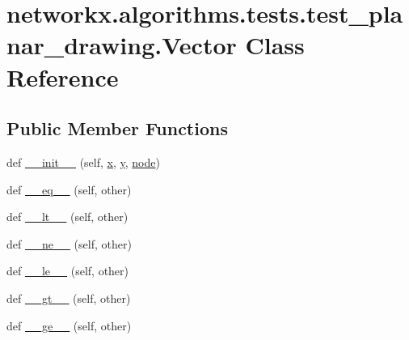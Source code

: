 \hypertarget{classnetworkx_1_1algorithms_1_1tests_1_1test__planar__drawing_1_1Vector}{}\section{networkx.\+algorithms.\+tests.\+test\+\_\+planar\+\_\+drawing.\+Vector Class Reference}
\label{classnetworkx_1_1algorithms_1_1tests_1_1test__planar__drawing_1_1Vector}
\subsection*{Public Member Functions}
\begin{DoxyCompactItemize}
\item 
def \hyperlink{classnetworkx_1_1algorithms_1_1tests_1_1test__planar__drawing_1_1Vector_ae12a093b25f636e1cabd33e08a45f9c4}{\+\_\+\+\_\+init\+\_\+\+\_\+} (self, \hyperlink{classnetworkx_1_1algorithms_1_1tests_1_1test__planar__drawing_1_1Vector_aee97bd5f43d0150508fc1487ce252897}{x}, \hyperlink{classnetworkx_1_1algorithms_1_1tests_1_1test__planar__drawing_1_1Vector_a0bf8986b1ca75c5c689d13a5c9fbf934}{y}, \hyperlink{classnetworkx_1_1algorithms_1_1tests_1_1test__planar__drawing_1_1Vector_a9f918dbe66cff416ed929e030ed91394}{node})
\item 
def \hyperlink{classnetworkx_1_1algorithms_1_1tests_1_1test__planar__drawing_1_1Vector_a182b33220fc73e6fc6a18e439bf05b4b}{\+\_\+\+\_\+eq\+\_\+\+\_\+} (self, other)
\item 
def \hyperlink{classnetworkx_1_1algorithms_1_1tests_1_1test__planar__drawing_1_1Vector_adb720f3f5c001be1cfcf1b5ca0b7ddcd}{\+\_\+\+\_\+lt\+\_\+\+\_\+} (self, other)
\item 
def \hyperlink{classnetworkx_1_1algorithms_1_1tests_1_1test__planar__drawing_1_1Vector_a3c517d48081484f9dfcdf9cc687eb1ab}{\+\_\+\+\_\+ne\+\_\+\+\_\+} (self, other)
\item 
def \hyperlink{classnetworkx_1_1algorithms_1_1tests_1_1test__planar__drawing_1_1Vector_a405a43d2456ce7a1165d8f668b90f2c9}{\+\_\+\+\_\+le\+\_\+\+\_\+} (self, other)
\item 
def \hyperlink{classnetworkx_1_1algorithms_1_1tests_1_1test__planar__drawing_1_1Vector_a5e556f9f924c08d3bb058d34ca7b8c3c}{\+\_\+\+\_\+gt\+\_\+\+\_\+} (self, other)
\item 
def \hyperlink{classnetworkx_1_1algorithms_1_1tests_1_1test__planar__drawing_1_1Vector_a6036614696ab2d3b51def04eee87a9bd}{\+\_\+\+\_\+ge\+\_\+\+\_\+} (self, other)
\end{DoxyCompactItemize}
